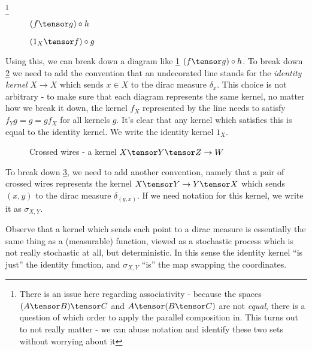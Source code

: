 \documentclass{article}
\begin{document}
\footnote{There is an issue here regarding associativity - because the spaces $(A \tensor B) \tensor C$ and $A \tensor (B \tensor C)$ are not \emph{equal}, there is a question of which order to apply the parallel composition in. This turns out to not really matter - we can abuse notation and identify these two sets without worrying about it}

\begin{figure}
    \begin{center}
    
    \end{center}
\caption{$(f \tensor g) \circ h$}
    \label{fig:ex1}
\end{figure}
    
\begin{figure}
\begin{center}

\end{center}
\caption{$(1_X \tensor f) \circ g$}
\label{fig:ex2}
\end{figure}

Using this, we can break down a diagram like \cref{fig:ex1} $(f \tensor g) \circ h$.
To break down \cref{fig:ex2} we need to add the convention that an undecorated line stands for the \emph{identity kernel} $X \to X$ which sends $x\in X$ to the dirac measure $\delta_x$.
This choice is not arbitrary - to make sure that each diagram represents the same kernel, no matter how we break it down, the kernel $f_X$ represented by the line needs to satisfy $f_Yg = g = gf_X$ for all kernels $g$.
It's clear that any kernel which satisfies this is equal to the identity kernel.
We write the identity kernel $1_X$.

\begin{figure}
\begin{center}

\end{center}
\caption{Crossed wires - a kernel $X \tensor Y \tensor Z \to W$}
\label{fig:cross}
\end{figure}


To break down \cref{fig:cross}, we need to add another convention, namely that a pair of crossed wires represents the kernel $X \tensor Y \to Y \tensor X$
which sends $(x,y)$ to the dirac measure $\delta_{(y,x)}$.
If we need notation for this kernel, we write it as $\sigma_{X,Y}$.

Observe that a kernel which sends each point to a dirac measure is essentially the same thing as a (measurable) function, viewed as a stochastic process which is not really stochastic at all, but deterministic. In this sense the identity kernel ``is just'' the identity function, and $\sigma_{X,Y}$ ``is'' the map swapping the coordinates.
\end{document}
